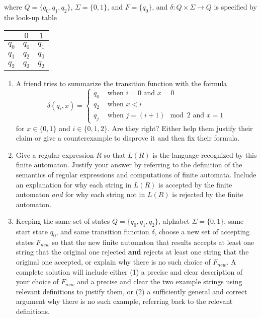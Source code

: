 \begin{enumerate}[wide, labelwidth=!, labelindent=0pt]
\begin{center}
\end{center}
where $Q = \{q_0, q_1, q_2\}$, $\Sigma = \{0,1\}$, and $F = \{q_0\}$, and $\delta: Q \times \Sigma \to Q$
is specified by the look-up table
\begin{center}
\begin{tabular}{c|cc}
        & $0$ & $1$ \\
    \hline
  $q_0$ & $q_0$ & $q_1$ \\
  $q_1$ & $q_2$ & $q_0$ \\
  $q_2$ & $q_2$ & $q_2$
\end{tabular}
\end{center}
    \begin{enumerate}
    \item\gradeComplete A friend tries to summarize the transition function with the formula
    \[
        \delta(q_i,x) = \begin{cases}
            q_0 &\text{ when $i=0$ and $x=0$} \\
            q_2 &\text{ when $x < i$}\\
            q_j &\text{ when $j = (i+1) \mod 2$ and $x=1$}
        \end{cases}
    \]
    for $x \in \{0,1\}$ and $i \in \{0,1,2\}$.
    Are they right? Either help them justify their claim or give a counterexample to disprove it and then 
    fix their formula.

    \item\gradeCorrect Give a regular expression $R$ so that $L(R)$ is the language 
    recognized by this finite automaton. Justify your answer by referring to the 
    definition of the semantics of regular expressions and computations of finite automata. 
    Include an explanation for why each string in $L(R)$ is accepted by the finite automaton {\it and}
    for why each string not in $L(R)$ is rejected by the finite automaton.

    \item\gradeCorrect Keeping the same set of states $Q = \{q_0, q_1, q_2\}$, alphabet $\Sigma = \{0,1\}$, 
    same start state $q_0$, and same transition 
    function $\delta$, choose a new set of accepting states $F_{new}$ so that the new 
    finite automaton that results accepts at least one string that the original one rejected {\bf and} rejects
    at least one string that the original one accepted, or explain why there is no such choice of $F_{new}$.
    A complete solution will include either (1) a precise and
    clear description of your choice of $F_{new}$
    and a precise and clear the two example strings using relevant definitions 
    to justify them, or (2) a sufficiently general and correct argument
    why there is no such example, referring back to the relevant definitions.


\end{enumerate}
\end{enumerate}
